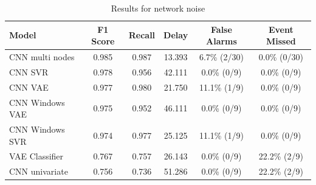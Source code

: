\begin{table}
\caption{Results for network noise}
\label{tab:results-noise}
\begin{tabular}{lccccc}
\toprule
Model & F1 Score & Recall & Delay & False Alarms & Event Missed \\
\midrule
CNN multi nodes & 0.985 & 0.987 & 13.393 & 6.7\% (2/30) & 0.0\% (0/30) \\
CNN SVR & 0.978 & 0.956 & 42.111 & 0.0\% (0/9) & 0.0\% (0/9) \\
CNN VAE & 0.977 & 0.980 & 21.750 & 11.1\% (1/9) & 0.0\% (0/9) \\
CNN Windows VAE & 0.975 & 0.952 & 46.111 & 0.0\% (0/9) & 0.0\% (0/9) \\
CNN Windows SVR & 0.974 & 0.977 & 25.125 & 11.1\% (1/9) & 0.0\% (0/9) \\
VAE Classifier & 0.767 & 0.757 & 26.143 & 0.0\% (0/9) & 22.2\% (2/9) \\
CNN univariate & 0.756 & 0.736 & 51.286 & 0.0\% (0/9) & 22.2\% (2/9) \\
\bottomrule
\end{tabular}
\end{table}
